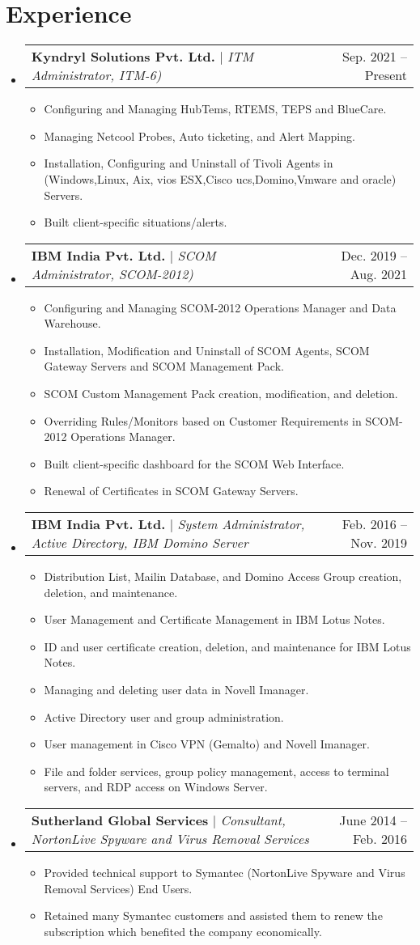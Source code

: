 \documentclass[letterpaper,10.5 pt]{article}
\makeatletter
\newcommand{\resumeItem}[1]{
	\item\small{
		{#1 \vspace{-2pt}}
	}
}
\newcommand{\resumeProjectHeading}[2]{
	\item
	\begin{tabular*}{0.97\textwidth}{l@{\extracolsep{\fill}}r}
		\small#1 & #2 \\
	\end{tabular*}\vspace{-7pt}
}
\newcommand{\resumeSubHeadingListStart}{\begin{itemize}[leftmargin=0.15in, label={}]}
\newcommand{\resumeSubHeadingListEnd}{\end{itemize}}
\newcommand{\resumeItemListStart}{\begin{itemize}}
\newcommand{\resumeItemListEnd}{\end{itemize}\vspace{-5pt}}
\makeatother
\begin{document}
	
	\section{Experience}
	\resumeSubHeadingListStart
	
	\resumeProjectHeading
	{\textbf{Kyndryl Solutions Pvt. Ltd.} $|$ \footnotesize\emph{ITM Administrator, ITM-6)}}{Sep. 2021 -- Present}
	\resumeItemListStart
	\resumeItem{Configuring and Managing HubTems, RTEMS, TEPS and BlueCare.}
	\resumeItem{Managing Netcool Probes, Auto ticketing, and Alert Mapping.}
	\resumeItem{Installation, Configuring and Uninstall of Tivoli Agents in (Windows,Linux, Aix, vios ESX,Cisco ucs,Domino,Vmware and oracle) Servers.}
	\resumeItem{Built client-specific situations/alerts.}
	\resumeItemListEnd
		
	\resumeProjectHeading
	{\textbf{IBM India Pvt. Ltd.} $|$ \footnotesize\emph{SCOM Administrator, SCOM-2012)}}{Dec. 2019 -- Aug. 2021}
	\resumeItemListStart
	\resumeItem{Configuring and Managing SCOM-2012 Operations Manager and Data Warehouse.}	
	\resumeItem{Installation, Modification and Uninstall of SCOM Agents, SCOM Gateway Servers and  SCOM Management Pack.}
	\resumeItem{SCOM Custom Management Pack creation, modification, and deletion.}
	\resumeItem{Overriding Rules/Monitors based on Customer Requirements in SCOM-2012 Operations Manager.}
	\resumeItem{Built client-specific dashboard for the SCOM Web Interface.}
	\resumeItem{Renewal of Certificates in SCOM Gateway Servers.}	
	\resumeItemListEnd
	
	\resumeProjectHeading
	{\textbf{IBM India Pvt. Ltd.} $|$ \footnotesize\emph{System Administrator, Active Directory, IBM Domino Server}}{Feb. 2016 -- Nov. 2019}
	\resumeItemListStart
	\resumeItem{Distribution List, Mailin Database, and Domino Access Group creation, deletion, and maintenance.}
	\resumeItem{User Management and Certificate Management in IBM Lotus Notes.}
	\resumeItem{ID and user certificate creation, deletion, and maintenance for IBM Lotus Notes.}
	\resumeItem{Managing and deleting user data in Novell Imanager.}
	\resumeItem{Active Directory user and group administration.}
	\resumeItem{User management in Cisco VPN (Gemalto) and Novell Imanager.}
	\resumeItem{File and folder services, group policy management, access to terminal servers, and RDP access on Windows Server.}	
	\resumeItemListEnd

	\resumeProjectHeading
	{\textbf{Sutherland Global Services} $|$ \footnotesize\emph{Consultant, NortonLive Spyware and Virus Removal Services}}{June 2014 -- Feb. 2016}
	\resumeItemListStart
	\resumeItem{Provided technical support to Symantec (NortonLive Spyware and Virus Removal Services) End Users.}
	\resumeItem{Retained many Symantec customers and assisted them to renew the subscription which benefited the company economically.}
	\resumeItemListEnd
	\resumeSubHeadingListEnd
	
\end{document}
